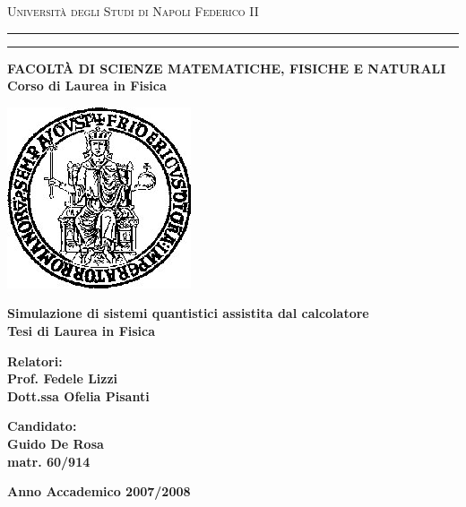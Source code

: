 


\pagestyle{empty}


\begin{center}
{{\Large{\textsc{Universit\`a degli Studi di Napoli Federico II
}}}} \rule[0.1cm]{13.0cm}{0.1mm}
\rule[0.5cm]{13.0cm}{0.6mm}
{\small{\bf FACOLT\`A DI SCIENZE MATEMATICHE, FISICHE E NATURALI\\
Corso di Laurea in Fisica}}
\end{center}
\vspace{5mm}
\begin{center}
\includegraphics[scale=0.32]{img/federico}
\end{center}
\vspace{5mm}
\begin{center}
{\LARGE{\bf Simulazione di sistemi quantistici assistita dal calcolatore}}\\
\vspace{19mm} {\large{\bf Tesi di Laurea in Fisica}}
\end{center}
\begin{center}
\end{center}
\noindent
\begin{minipage}[t]{0.47\textwidth}
{\large{\bf Relatori:\\
Prof. Fedele Lizzi\\
Dott.ssa Ofelia Pisanti}}
\end{minipage}
\hfill
\begin{minipage}[t]{0.47\textwidth}\raggedleft
{\large{\bf Candidato:\\
Guido De Rosa\\
matr. 60/914}}
\end{minipage}
\vspace{20mm}
\begin{center}
{\large{\bf %
Anno Accademico 2007/2008 }}%
\end{center}





